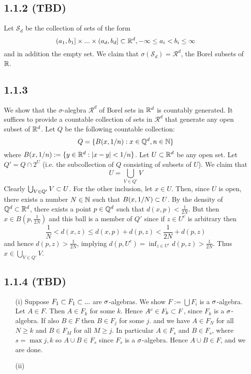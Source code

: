 \documentclass[11pt]{article}
\begin{document}
\subsection*{1.1.2 (TBD)}

Let $\mathcal{S}_d$ be the collection of sets of the form \[(a_1, b_1]\times ... \times (a_d, b_d]\subset {\mathbb R}^d, -\infty\leq a_i < b_i \leq \infty\] and in addition the empty set. We claim that $\sigma(\mathcal{S}_d) = \mathcal{R}^d$, the Borel subsets of ${\mathbb R}$. 

\subsection*{1.1.3}

We show that the $\sigma$-alegbra $\mathcal{R}^d$ of Borel sets in ${\mathbb R}^d$ is countably generated. It suffices to provide a countable collection of sets in $\mathcal{R}^d$ that generate any open subset of ${\mathbb R}^d$. Let $Q$ be the following countable collection: \[Q = \{B(x, 1/n): x \in {\mathbb Q}^d, n \in {\mathbb N}\}\] where $B(x, 1/n) := \{y \in {\mathbb R}^d: |x-y|<1/n\}$. Let $U \subset {\mathbb R}^d$ be any open set. Let $Q' = Q \cap 2^U$ (i.e. the subcollection of $Q$ consisting of subsets of $U$). We claim that \[U = \bigcup_{V\in Q'} V\] Clearly $\bigcup_{V\in Q'} V \subset U$. For the other inclusion, let $x \in U$. Then, since $U$ is open, there exists a number $N \in {\mathbb N}$ such that $B(x, 1/N) \subset U$. By the density of ${\mathbb Q}^d \subset {\mathbb R}^d$, there exists a point $p \in {\mathbb Q}^d$ such that $d(x,p) < \frac{1}{2N}$. But then $x \in B(p, \frac{1}{2N})$ and this ball is a member of $Q'$ since if $z \in U^c$ is arbitrary then \[\frac{1}{N} < d(x,z) \leq d(x, p) + d(p, z) < \frac{1}{2N} + d(p,z)\] and hence $d(p,z) > \frac{1}{2N}$, implying $d(p, U^c) = \inf_{z\in U^c} d(p, z) > \frac{1}{2N}$. Thus $x \in \bigcup_{V\in Q'} V$.

\subsection*{1.1.4 (TBD)}
 \begin{enumerate}
    \item[(i)] Suppose $F_1 \subset F_1 \subset ...$ are $\sigma$-algebras. We show $F := \bigcup F_i$ is a $\sigma$-algebra. Let $A \in F$. Then $A \in F_k$ for some $k$. Hence $A^c \in F_k \subset F$, since $F_k$ is a $\sigma$-algebra. If also $B \in F$ then $B \in F_j$ for some $j$. and we have $A \in F_N$ for all $N \geq k$ and $B \in F_M$ for all $M \geq j$. In particular $A \in F_s$ and $B \in F_s$, where $s = \max{j,k}$ so $A \cup B \in  F_s$ since $F_s$ is a $\sigma$-algebra. Hence $A \cup B \in F$, and we are done.
    \item[(ii)]
 \end{enumerate}
\end{document}
